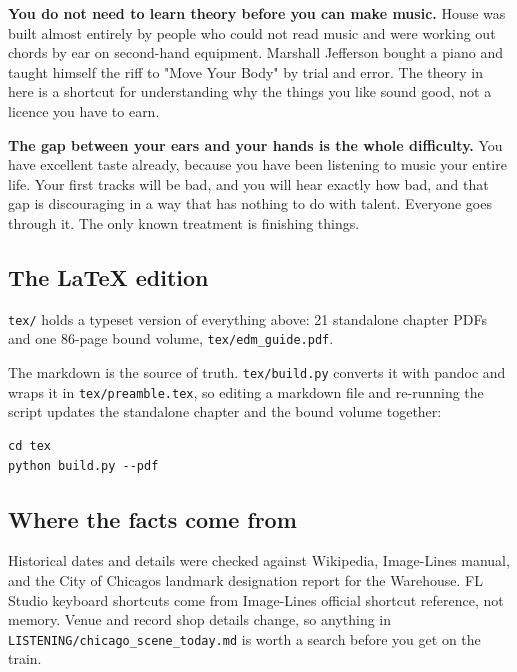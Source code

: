 \textbf{You do not need to learn theory before you can make music.} House was built almost
entirely by people who could not read music and were working out chords by ear on
second-hand equipment. Marshall Jefferson bought a piano and taught himself the riff to
"Move Your Body" by trial and error. The theory in here is a shortcut for understanding why
the things you like sound good, not a licence you have to earn.

\textbf{The gap between your ears and your hands is the whole difficulty.} You have excellent
taste already, because you have been listening to music your entire life. Your first
tracks will be bad, and you will hear exactly how bad, and that gap is discouraging in a
way that has nothing to do with talent. Everyone goes through it. The only known treatment
is finishing things.

\subsection{The LaTeX edition}\label{00_how_to_use-the-latex-edition}

\texttt{tex/} holds a typeset version of everything above: 21 standalone chapter PDFs and one
86-page bound volume, \texttt{tex/edm\_guide.pdf}.

The markdown is the source of truth. \texttt{tex/build.py} converts it with pandoc and wraps it in
\texttt{tex/preamble.tex}, so editing a markdown file and re-running the script updates the
standalone chapter and the bound volume together:

\begin{verbatim}
cd tex
python build.py --pdf
\end{verbatim}

\subsection{Where the facts come from}\label{00_how_to_use-where-the-facts-come-from}

Historical dates and details were checked against Wikipedia, Image-Line\textquotesingle s manual, and the
City of Chicago\textquotesingle s landmark designation report for the Warehouse. FL Studio keyboard
shortcuts come from Image-Line\textquotesingle s official shortcut reference, not memory. Venue and record
shop details change, so anything in \texttt{LISTENING/chicago\_scene\_today.md} is worth a search
before you get on the train.
